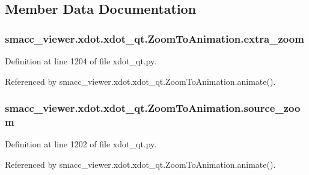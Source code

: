 \subsection{Member Data Documentation}
\subsubsection[{\texorpdfstring{extra\+\_\+zoom}{extra_zoom}}]{\setlength{\rightskip}{0pt plus 5cm}smacc\+\_\+viewer.\+xdot.\+xdot\+\_\+qt.\+Zoom\+To\+Animation.\+extra\+\_\+zoom}\hypertarget{classsmacc__viewer_1_1xdot_1_1xdot__qt_1_1ZoomToAnimation_a66b4693cd4ce88c2f2b75d00132abd2d}{}\label{classsmacc__viewer_1_1xdot_1_1xdot__qt_1_1ZoomToAnimation_a66b4693cd4ce88c2f2b75d00132abd2d}


Definition at line 1204 of file xdot\+\_\+qt.\+py.



Referenced by smacc\+\_\+viewer.\+xdot.\+xdot\+\_\+qt.\+Zoom\+To\+Animation.\+animate().

\subsubsection[{\texorpdfstring{source\+\_\+zoom}{source_zoom}}]{\setlength{\rightskip}{0pt plus 5cm}smacc\+\_\+viewer.\+xdot.\+xdot\+\_\+qt.\+Zoom\+To\+Animation.\+source\+\_\+zoom}\hypertarget{classsmacc__viewer_1_1xdot_1_1xdot__qt_1_1ZoomToAnimation_aedf5392aa82941dcec7f70af9c3a0fcc}{}\label{classsmacc__viewer_1_1xdot_1_1xdot__qt_1_1ZoomToAnimation_aedf5392aa82941dcec7f70af9c3a0fcc}


Definition at line 1202 of file xdot\+\_\+qt.\+py.



Referenced by smacc\+\_\+viewer.\+xdot.\+xdot\+\_\+qt.\+Zoom\+To\+Animation.\+animate().

